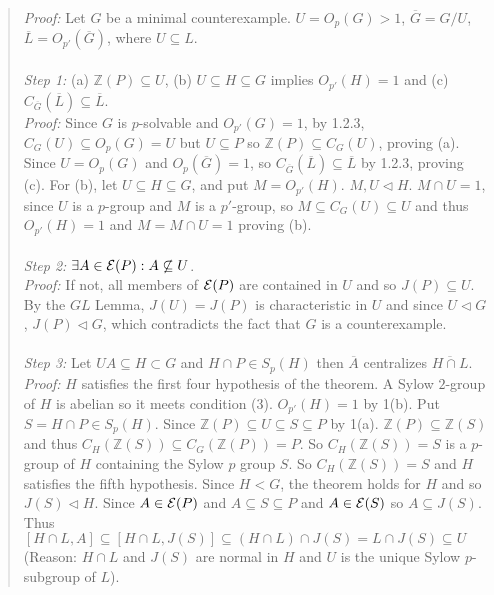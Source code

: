 \begin{quote}
\emph{Proof:} 
Let $G$ be a minimal counterexample.  $U=O_{p}(G) > 1$, ${\overline G} = G/U$,
${\overline L} = O_{p'}({\overline G})$, where $U \subseteq L$. \\
\\
\emph{Step 1:} (a) ${\mathbb Z}(P) \subseteq U$, (b) $U \subseteq H \subseteq G$ implies $O_{p'}(H)=1$ and
(c) $C_{{\overline G}}({\overline L}) \subseteq {\overline L}$.\\
\emph{Proof:} 
Since $G$ is $p$-solvable and $O_{p'}(G)=1$,
by 1.2.3, $C_G(U) \subseteq O_p(G) = U$ but $U \subseteq P$ so
${\mathbb Z}(P) \subseteq C_G(U)$, proving (a).
Since $U = O_p(G)$ and $O_p({\overline G}) = 1$, so 
$C_{{\overline G}}({\overline L}) \subseteq {\overline L}$ by 1.2.3,
proving (c).  For (b), let
$U \subseteq H \subseteq G$, and put $M= O_{p'}(H)$.  $M, U \lhd H$. $M \cap U =1$, since
$U$ is a $p$-group and $M$ is a $p'$-group, so $M \subseteq C_G(U) \subseteq U$ and thus $O_{p'}(H)=1$
and $M= M \cap U =1$ proving (b).
\\
\\
\emph{Step 2:} $\exists A \in {\cal E}(P): A \not\subseteq U$.\\
\emph{Proof:} If not, all members of ${\cal E}(P)$ are contained in $U$ and so $J(P) \subseteq U$.
By the $GL$ Lemma, $J(U) = J(P)$ is characteristic in $U$ and since $U \lhd G$, $J(P) \lhd G$,
which contradicts the fact that $G$ is a counterexample.
\\
\\
\emph{Step 3:} Let $UA \subseteq H \subset G$ and $H \cap P \in S_p(H)$ then ${\overline A}$ centralizes
${\overline {H \cap L}}$.\\
\emph{Proof:}  $H$ satisfies the first four hypothesis of the theorem.  A Sylow $2$-group of $H$ is abelian so
it meets condition (3).  $O_{p'}(H) = 1$ by 1(b).
Put $S = H \cap P \in S_p(H)$.  Since ${\mathbb Z}(P) \subseteq U \subseteq S \subseteq P$ by 1(a).
${\mathbb Z}(P) \subseteq {\mathbb Z}(S)$ and thus $C_H({\mathbb Z}(S)) \subseteq C_G({\mathbb Z}(P)) = P$.
So $C_H({\mathbb Z}(S)) = S$ is a $p$-group of $H$ containing the Sylow $p$ group $S$.
So $C_H({\mathbb Z}(S)) = S$ and $H$ satisfies the fifth hypothesis.  Since $H < G$, the theorem holds
for $H$ and so $J(S) \lhd H$.  Since $A \in {\cal E}(P)$ and $A \subseteq S \subseteq P$ and $A \in {\cal E}(S)$ so
$A \subseteq J(S)$.  Thus $[H \cap L, A] \subseteq [H \cap L, J(S)] \subseteq (H \cap L) \cap J(S) = L \cap J(S) \subseteq U$
(Reason: $H \cap L$ and $J(S)$ are normal in $H$ and $U$ is the unique Sylow $p$-subgroup of $L$).

\end{quote}
